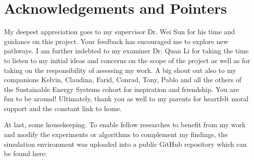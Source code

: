 \documentclass[11pt,twoside,nopardent,notitlepage,fancychap,hyper]{edengths}
\begin{document}
%
%


%




\listoffiguresandtables



%

%

\chapter*{Acknowledgements and Pointers}
{}%

My deepest appreciation goes to my supervisor Dr. Wei Sun for his time and guidance on this project. Your feedback has encouraged me to explore new pathways. I am further indebted to my examiner Dr. Quan Li for taking the time to listen to my initial ideas and concerns on the scope of the project as well as for taking on the responsibility of assessing my work. A big shout out also to my companions Kelvin, Claudina, Farid, Conrad, Tony, Pablo and all the others of the Sustainable Energy Systems cohort for inspiration and friendship. You are fun to be around! Ultimately, thank you as well to my parents for heartfelt moral support and the constant link to home.

At last, some housekeeping. To enable fellow researches to benefit from my work and modify the experiments or algorithms to complement my findings, the simulation environment was uploaded into a public GitHub repository which can be found here:
\end{document}
